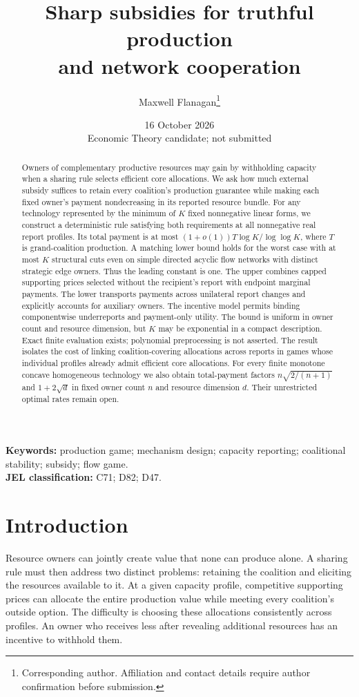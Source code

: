 \documentclass[11pt]{article}
\title{Sharp subsidies for truthful production\\and network cooperation}
\author{Maxwell Flanagan\thanks{Corresponding author. Affiliation and contact details require author confirmation before submission.}}
\date{16 October 2026\\[2pt]\small Economic Theory candidate; not submitted}
\theoremstyle{definition}\newtheorem{definition}[theorem]{Definition}
\theoremstyle{remark}\newtheorem{remark}[theorem]{Remark}
\begin{document}
\maketitle
\begin{abstract}
Owners of complementary productive resources may gain by withholding capacity
when a sharing rule selects efficient core allocations. We ask how much
external subsidy suffices to retain every coalition's production guarantee
while making each fixed owner's payment nondecreasing in its reported
resource bundle. For any technology represented by the minimum of $K$ fixed
nonnegative linear forms, we construct a deterministic rule satisfying both
requirements at all nonnegative real report profiles. Its total payment is
at most $(1+o(1))T\log K/\log\log K$, where $T$ is grand-coalition production.
A matching lower bound holds for the worst case with at most $K$ structural
cuts even on simple directed acyclic flow networks with distinct strategic
edge owners. Thus the leading constant is one. The upper combines capped
supporting prices selected without the recipient's report with endpoint
marginal payments. The lower transports payments across unilateral report
changes and explicitly accounts for auxiliary owners. The incentive model
permits binding componentwise underreports and payment-only utility.
The bound is uniform in owner count and resource dimension, but $K$ may be
exponential in a compact description. Exact finite evaluation exists;
polynomial preprocessing is not asserted. The result isolates the cost of
linking coalition-covering allocations across reports in games whose
individual profiles already admit efficient core allocations. For every finite
monotone concave homogeneous technology we also obtain total-payment factors
$n\sqrt{2/(n+1)}$ and $1+2\sqrt d$ in fixed owner count $n$ and resource
dimension $d$. Their unrestricted optimal rates remain open.
\end{abstract}
\noindent\textbf{Keywords:} production game; mechanism design; capacity reporting;
coalitional stability; subsidy; flow game.\\
\textbf{JEL classification:} C71; D82; D47.

\section{Introduction}
Resource owners can jointly create value that none can produce alone. A
sharing rule must then address two distinct problems: retaining the coalition
and eliciting the resources available to it. At a given capacity profile,
competitive supporting prices can allocate the entire production value while
meeting every coalition's outside option. The difficulty is choosing these
allocations consistently across profiles. An owner who receives less after
revealing additional resources has an incentive to withhold them.
\end{document}
